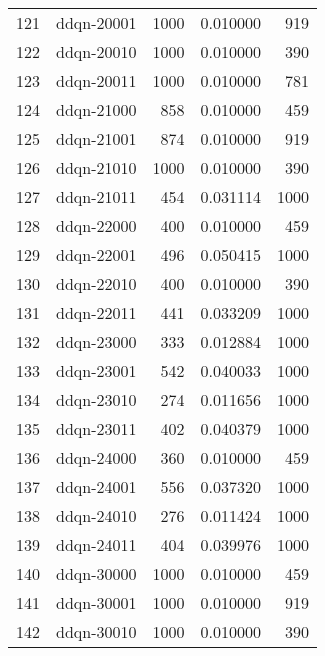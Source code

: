 \documentclass{article}
\begin{document}
\begin{table}
\begin{tabular}{llrrr}
121 &           ddqn-20001 &            1000 &   0.010000 &               919 \\
122 &           ddqn-20010 &            1000 &   0.010000 &               390 \\
123 &           ddqn-20011 &            1000 &   0.010000 &               781 \\
124 &           ddqn-21000 &             858 &   0.010000 &               459 \\
125 &           ddqn-21001 &             874 &   0.010000 &               919 \\
126 &           ddqn-21010 &            1000 &   0.010000 &               390 \\
127 &           ddqn-21011 &             454 &   0.031114 &              1000 \\
128 &           ddqn-22000 &             400 &   0.010000 &               459 \\
129 &           ddqn-22001 &             496 &   0.050415 &              1000 \\
130 &           ddqn-22010 &             400 &   0.010000 &               390 \\
131 &           ddqn-22011 &             441 &   0.033209 &              1000 \\
132 &           ddqn-23000 &             333 &   0.012884 &              1000 \\
133 &           ddqn-23001 &             542 &   0.040033 &              1000 \\
134 &           ddqn-23010 &             274 &   0.011656 &              1000 \\
135 &           ddqn-23011 &             402 &   0.040379 &              1000 \\
136 &           ddqn-24000 &             360 &   0.010000 &               459 \\
137 &           ddqn-24001 &             556 &   0.037320 &              1000 \\
138 &           ddqn-24010 &             276 &   0.011424 &              1000 \\
139 &           ddqn-24011 &             404 &   0.039976 &              1000 \\
140 &           ddqn-30000 &            1000 &   0.010000 &               459 \\
141 &           ddqn-30001 &            1000 &   0.010000 &               919 \\
142 &           ddqn-30010 &            1000 &   0.010000 &               390 \\

\end{tabular}
\end{table}
\end{document}
